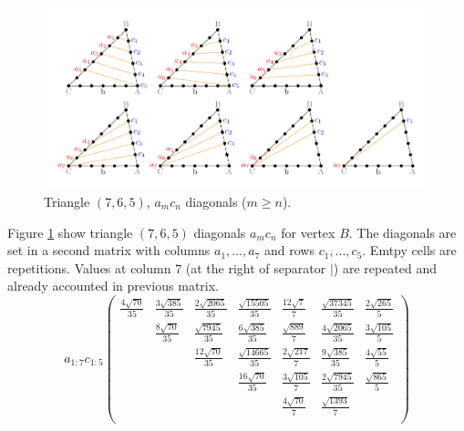 \documentclass[11pt]{article}
\begin{document}
\begin{figure}[htp]
\centering
\includegraphics[scale=1]{t765ac}
\caption{Triangle $(7,6,5)$, $a_mc_n$ diagonals ($m \ge n$).}
\label{t765ac}
\end{figure}
Figure \ref{t765ac} show triangle $(7,6,5)$ diagonals $a_mc_n$ for vertex $B$. 
The diagonals are set in a second matrix with columns $a_1,...,a_7$ and rows $c_1,...,c_5$. Emtpy cells are repetitions.
Values at column 7 (at the right of separator $|$) are repeated and already accounted in previous matrix.
\begin{equation}\label{eq:appendrow}
a_{1:7}c_{1:5}\left(\begin{array}{ccccccc}
\frac{4\sqrt{70}}{35} & \frac{3\sqrt{385}}{35} & \frac{2\sqrt{2065}}{35} & \frac{\sqrt{15505}}{35} & \frac{12\sqrt{7}}{7} & \frac{\sqrt{37345}}{35} & \frac{2\sqrt{265}}{5} \\
& \frac{8\sqrt{70}}{35} & \frac{\sqrt{7945}}{35} & \frac{6\sqrt{385}}{35} & \frac{\sqrt{889}}{7} & \frac{4\sqrt{2065}}{35} & \frac{3\sqrt{105}}{5} \\
& & \frac{12\sqrt{70}}{35} & \frac{\sqrt{14665}}{35} & \frac{2\sqrt{217}}{7} & \frac{9\sqrt{385}}{35} & \frac{4\sqrt{55}}{5} \\
& & & \frac{16\sqrt{70}}{35} & \frac{3\sqrt{105}}{7} & \frac{2\sqrt{7945}}{35} & \frac{\sqrt{865}}{5} \\
& & & & \frac{4\sqrt{70}}{7} & \frac{\sqrt{1393}}{7} & \\
\end{array}\right)
\end{equation}
\end{document}
